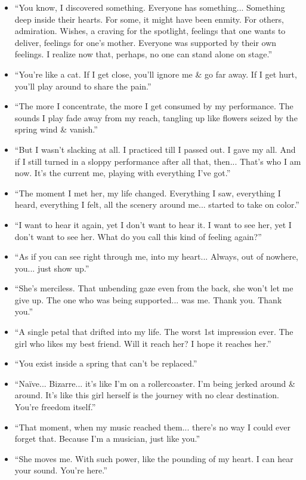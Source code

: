 \documentclass{article}
\begin{document}
\begin{enumerate}
\begin{itemize}
    	\item ``You know, I discovered something. Everyone has something... Something deep inside their hearts. For some, it might have been enmity. For others, admiration. Wishes, a craving for the spotlight, feelings that one wants to deliver, feelings for one's mother. Everyone was supported by their own feelings. I realize now that, perhaps, no one can stand alone on stage.''
    	\item ``You're like a cat. If I get close, you'll ignore me \& go far away. If I get hurt, you'll play around to share the pain.''
    	\item ``The more I concentrate, the more I get consumed by my performance. The sounds I play fade away from my reach, tangling up like flowers seized by the spring wind \& vanish.''
    	\item ``But I wasn't slacking at all. I practiced till I passed out. I gave my all. And if I still turned in a sloppy performance after all that, then... That's who I am now. It's the current me, playing with everything I've got.''
    	\item ``The moment I met her, my life changed. Everything I saw, everything I heard, everything I felt, all the scenery around me... started to take on color.''
    	\item ``I want to hear it again, yet I don't want to hear it. I want to see her, yet I don't want to see her. What do you call this kind of feeling again?''
    	\item ``As if you can see right through me, into my heart... Always, out of nowhere, you... just show up.''
    	\item ``She's merciless. That unbending gaze even from the back, she won't let me give up. The one who was being supported... was me. Thank you. Thank you.''
    	\item ``A single petal that drifted into my life. The worst 1st impression ever. The girl who likes my best friend. Will it reach her? I hope it reaches her.''
    	\item ``You exist inside a spring that can't be replaced.''
    	\item ``Naïve... Bizarre... it's like I'm on a rollercoaster. I'm being jerked around \& around. It's like this girl herself is the journey with no clear destination. You're freedom itself.''
    	\item ``That moment, when my music reached them... there's no way I could ever forget that. Because I'm a musician, just like you.''
    	\item ``She moves me. With such power, like the pounding of my heart. I can hear your sound. You're here.''

\end{itemize}
\end{enumerate}
\end{document}
